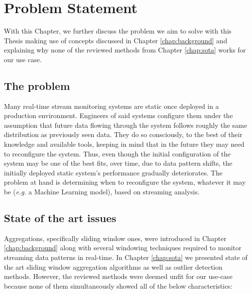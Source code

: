 \chapter{Problem Statement} \label{chap:statement} \minitoc

With this Chapter, we further discuss the problem we aim to solve with this Thesis making use of concepts discussed in Chapter \ref{chap:background} and explaining why none of the reviewed methods from Chapter \ref{chap:sota} works for our use case.

\section{The problem}
Many real-time stream monitoring systems are static once deployed in a production environment. Engineers of said systems configure them under the assumption that future data flowing through the system follows roughly the same distribution as previously seen data. They do so consciously, to the best of their knowledge and available tools, keeping in mind that in the future they may need to reconfigure the system. Thus, even though the initial configuration of the system may be one of the best fits, over time, due to data pattern shifts, the initially deployed static system's performance gradually deteriorates. The problem at hand is determining when to reconfigure the system, whatever it may be (\textit{e.g.} a Machine Learning model), based on streaming analysis.

\section{State of the art issues}
Aggregations, specifically sliding window ones, were introduced in Chapter \ref{chap:background} along with several windowing techniques required to monitor streaming data patterns in real-time. In Chapter \ref{chap:sota} we presented state of the art sliding window aggregation algorithms as well as outlier detection methods. However, the reviewed methods were deemed unfit for our use-case because none of them simultaneously showed all of the below characteristics:

